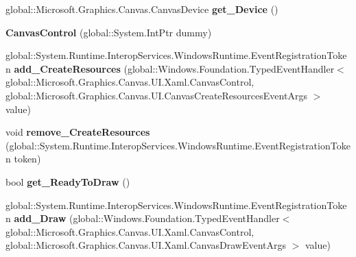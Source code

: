 \begin{DoxyCompactItemize}
global\+::\+Microsoft.\+Graphics.\+Canvas.\+Canvas\+Device {\bfseries get\+\_\+\+Device} ()
\item 
\mbox{\label{class_microsoft_1_1_graphics_1_1_canvas_1_1_u_i_1_1_xaml_1_1_canvas_control_a31a6da4afc396ee8034865c568463129}} 
{\bfseries Canvas\+Control} (global\+::\+System.\+Int\+Ptr dummy)
\item 
\mbox{\label{class_microsoft_1_1_graphics_1_1_canvas_1_1_u_i_1_1_xaml_1_1_canvas_control_ab026eb60db1a9fa4336dcb1ac14e4fb4}} 
global\+::\+System.\+Runtime.\+Interop\+Services.\+Windows\+Runtime.\+Event\+Registration\+Token {\bfseries add\+\_\+\+Create\+Resources} (global\+::\+Windows.\+Foundation.\+Typed\+Event\+Handler$<$ global\+::\+Microsoft.\+Graphics.\+Canvas.\+U\+I.\+Xaml.\+Canvas\+Control, global\+::\+Microsoft.\+Graphics.\+Canvas.\+U\+I.\+Canvas\+Create\+Resources\+Event\+Args $>$ value)
\item 
\mbox{\label{class_microsoft_1_1_graphics_1_1_canvas_1_1_u_i_1_1_xaml_1_1_canvas_control_aee51056da35ed3fa259233ef54dda668}} 
void {\bfseries remove\+\_\+\+Create\+Resources} (global\+::\+System.\+Runtime.\+Interop\+Services.\+Windows\+Runtime.\+Event\+Registration\+Token token)
\item 
\mbox{\label{class_microsoft_1_1_graphics_1_1_canvas_1_1_u_i_1_1_xaml_1_1_canvas_control_a8c352fee2e45098d724d65a687a38126}} 
bool {\bfseries get\+\_\+\+Ready\+To\+Draw} ()
\item 
\mbox{\label{class_microsoft_1_1_graphics_1_1_canvas_1_1_u_i_1_1_xaml_1_1_canvas_control_a733ea4b79b9f0c15e8be4a4701c50a33}} 
global\+::\+System.\+Runtime.\+Interop\+Services.\+Windows\+Runtime.\+Event\+Registration\+Token {\bfseries add\+\_\+\+Draw} (global\+::\+Windows.\+Foundation.\+Typed\+Event\+Handler$<$ global\+::\+Microsoft.\+Graphics.\+Canvas.\+U\+I.\+Xaml.\+Canvas\+Control, global\+::\+Microsoft.\+Graphics.\+Canvas.\+U\+I.\+Xaml.\+Canvas\+Draw\+Event\+Args $>$ value)
\item 

\end{DoxyCompactItemize}
